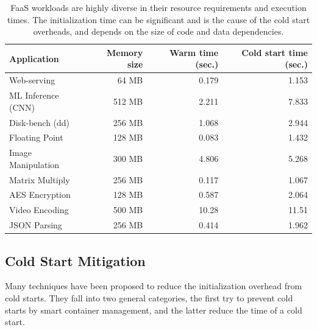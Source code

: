 \begin{table}
  \centering
  \caption{FaaS workloads are highly diverse in their resource requirements and execution times. The initialization time can be significant and is the cause of the cold start overheads, and depends on the size of code and data dependencies.}
  \begin{tabular}{lrrr}
    \hline 
    Application & Memory size & Warm time (sec.) & Cold start time (sec.) \\
    \hline
    Web-serving & 64 MB & 0.179 & 1.153 \\  
    ML Inference (CNN) & 512 MB & 2.211 & 7.833 \\
    Disk-bench (dd) & 256 MB & 1.068 & 2.944 \\  
    Floating Point & 128 MB & 0.083 & 1.432 \\  
    Image Manipulation & 300 MB & 4.806 & 5.268 \\  
    Matrix Multiply & 256 MB & 0.117 & 1.067 \\  
    AES Encryption & 128 MB & 0.587 & 2.064 \\  
    Video Encoding & 500 MB & 10.28 & 11.51 \\  
    JSON Parsing & 256 MB & 0.414 & 1.962 \\
    \hline
  \end{tabular}
  \label{tab:bg:workloads}
\end{table}

\subsection{Cold Start Mitigation}

Many techniques have been proposed to reduce the initialization overhead from cold starts.
They fall into two general categories, the first try to prevent cold starts by smart container management, and the latter reduce the time of a cold start.

